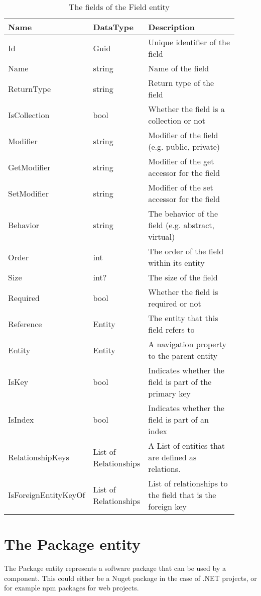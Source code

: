 \begin{table}[H]
\small
\begin{tabular}{ p{0.23\linewidth} p{0.23\linewidth} p{0.45\linewidth} }
\hline
\textbf{Name} & \textbf{DataType} & \textbf{Description} \\
\hline
Id & Guid & Unique identifier of the field \\
Name & string & Name of the field \\
ReturnType & string & Return type of the field \\
IsCollection & bool & Whether the field is a collection or not \\
Modifier & string & Modifier of the field (e.g. public, private) \\
GetModifier & string & Modifier of the get accessor for the field \\
SetModifier & string & Modifier of the set accessor for the field \\
Behavior & string & The behavior of the field (e.g. abstract, virtual) \\
Order & int & The order of the field within its entity \\
Size & int? & The size of the field \\
Required & bool & Whether the field is required or not \\
Reference & Entity & The entity that this field refers to\\
Entity & Entity & A navigation property to the parent entity \\
IsKey & bool & Indicates whether the field is part of the primary key \\
IsIndex & bool & Indicates whether the field is part of an index \\
RelationshipKeys & List of Relationships & A List of entities that are defined as relations. \\
IsForeignEntityKeyOf & List of Relationships & List of relationships to the field that is the foreign key \\
\hline
\end{tabular}
\caption{The fields of the Field entity}
\label{table:field_entity}
\end{table}

\section{The Package entity}

The Package entity represents a software package that can be used by a component. This
could either be a Nuget package in the case of .NET projects, or for example npm packages
for web projects.


